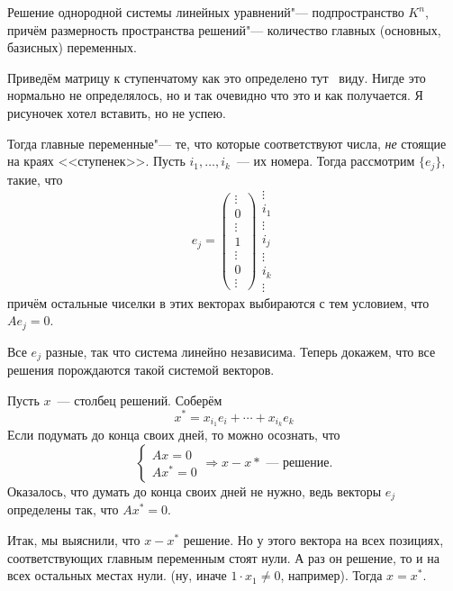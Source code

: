 \documentclass[12pt]{../../../notes}
\begin{document}
\begin{thrm}\label{thrm:homsystsolspc}
  Решение однородной системы линейных уравнений"--- подпространство $K^n$, причём размерность
  пространства решений"--- количество главных (основных, базисных) переменных.
\end{thrm}
\begin{ittproof}
  Приведём матрицу к ступенчатому как это определено тут~\cite[стр.~50]{Vinberg} виду. Нигде это нормально не 
  определялось, но и так очевидно что это и как получается. Я рисуночек хотел вставить, но не
  успею.
  
  Тогда главные переменные"--- те, что которые соответствуют числа, \emph{не} стоящие на краях 
  <<ступенек>>. Пусть $i_1, \dotsc , i_k$~--- их номера. Тогда рассмотрим $\{e_j\}$, такие, что
  \[
    e_j = 
    \begin{pmatrix}
      \vdots \\
      0 \\
      \vdots \\
      1 \\
      \vdots \\
      0\\
      \vdots
    \end{pmatrix}
    \begin{matrix}
      \vdots \\
      i_1 \\
      \vdots \\
      i_j \\
      \vdots \\
      i_k\\
      \vdots
    \end{matrix}
  \]
  причём остальные чиселки в этих векторах выбираются с тем условием, что $A e_j = 0$.

  Все $e_j$ разные, так что система линейно независима. Теперь докажем, что все решения
  порождаются такой системой векторов. 

  Пусть $x$~--- столбец решений. Соберём
  \[
    x^* = x_{i_1} e_i + \dotsb +x_{i_k} e_k 
  \]
  Если подумать до конца своих дней, то можно осознать, что
  \[
    \begin{cases}
      A x = 0 \\
      A x^* = 0
    \end{cases} \Rightarrow x-x*\text{~--- решение}.
  \]
  Оказалось, что думать до конца своих дней не нужно, ведь векторы $e_j$ определены так, что  
  $Ax^* = 0$. 
  
  Итак, мы выяснили, что $x-x^*$ решение. Но у этого вектора на всех позициях, соответствующих
  главным переменным стоят нули. А раз он решение, то и на всех остальных местах нули.
  (ну, иначе $1\cdot x_1 \neq 0$, например). Тогда $x = x^*$.


\end{ittproof}
\end{document}
